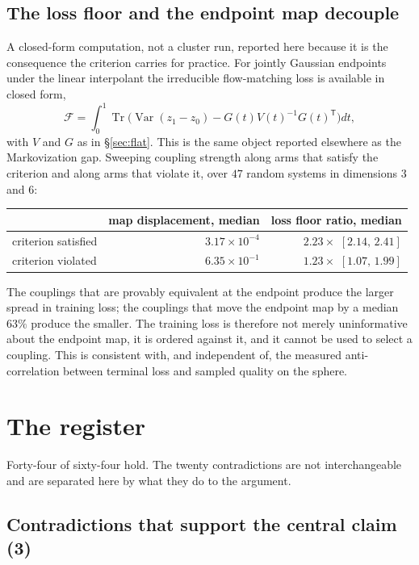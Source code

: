 \documentclass[11pt]{article}
\newcommand{\T}{\mathsf{T}}
\begin{document}
\subsection{The loss floor and the endpoint map decouple}

A closed-form computation, not a cluster run, reported here because it is the consequence the
criterion carries for practice. For jointly Gaussian endpoints under the linear interpolant the
irreducible flow-matching loss is available in closed form,
\[
\mathcal F=\int_0^1\operatorname{Tr}\Big(\operatorname{Var}(z_1-z_0)-G(t)V(t)^{-1}G(t)^{\T}\Big)dt,
\]
with $V$ and $G$ as in \S\ref{sec:flat}. This is the same object reported elsewhere as the
Markovization gap. Sweeping coupling strength along arms that satisfy the criterion and along
arms that violate it, over $47$ random systems in dimensions $3$ and $6$:

\begin{center}
\begin{tabular}{@{}lrr@{}}
\toprule
& map displacement, median & loss floor ratio, median\\
\midrule
criterion satisfied & $3.17\times10^{-4}$ & $2.23\times$ \quad $[2.14,\,2.41]$\\
criterion violated & $6.35\times10^{-1}$ & $1.23\times$ \quad $[1.07,\,1.99]$\\
\bottomrule
\end{tabular}
\end{center}

The couplings that are provably equivalent at the endpoint produce the larger spread in training
loss; the couplings that move the endpoint map by a median $63\%$ produce the smaller. The
training loss is therefore not merely uninformative about the endpoint map, it is ordered against
it, and it cannot be used to select a coupling. This is consistent with, and independent of, the
measured anti-correlation between terminal loss and sampled quality on the sphere.

\section{The register}
\label{sec:reg}

Forty-four of sixty-four hold. The twenty contradictions are not interchangeable and are separated
here by what they do to the argument.

\subsection*{Contradictions that support the central claim (3)}
\end{document}
